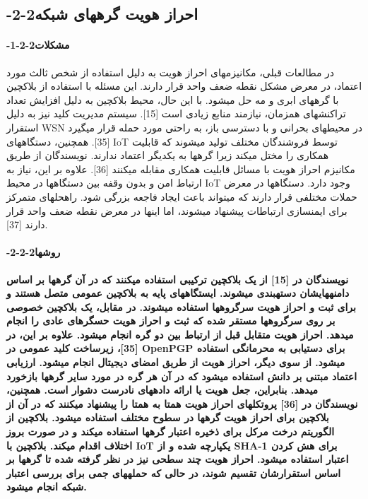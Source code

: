 \documentclass{article} %
\begin{document}
\noindent 
\subsection{ -2-2احراز هویت گرههای شبکه}

\noindent 
\paragraph{ -1-2-2مشکلات}

\noindent در مطالعات قبلی، مکانیزمهای احراز هویت به دلیل استفاده از شخص ثالث مورد اعتماد، در معرض مشکل نقطه ضعف واحد قرار دارند. این مسئله با استفاده از بلاکچین با گرههای ابری و مه حل میشود. با این حال، محیط بلاکچین به دلیل افزایش تعداد تراکنشهای همزمان، نیازمند منابع زیادی است [15]. سیستم مدیریت کلید نیز به دلیل استقرار WSN در محیطهای بحرانی و با دسترسی باز، به راحتی مورد حمله قرار میگیرد [35]. همچنین، دستگاههای IoT توسط فروشندگان مختلف تولید میشوند که قابلیت همکاری را مختل میکند زیرا گرهها به یکدیگر اعتماد ندارند. نویسندگان از طریق مکانیزم احراز هویت با مسائل قابلیت همکاری مقابله میکنند [36]. علاوه بر این، نیاز به ارتباط امن و بدون وقفه بین دستگاهها در محیط IoT وجود دارد. دستگاهها در معرض حملات مختلفی قرار دارند که میتواند باعث ایجاد فاجعه بزرگی شود. راهحلهای متمرکز برای ایمنسازی ارتباطات پیشنهاد میشوند، اما اینها در معرض نقطه ضعف واحد قرار دارند [37].

\noindent 
\paragraph{ -2-2-2روشها}

\noindent 
{\bf نویسندگان در [15] از یک بلاکچین ترکیبی استفاده میکنند که در آن گرهها بر اساس دامنههایشان دستهبندی میشوند. ایستگاههای پایه به بلاکچین عمومی متصل هستند و برای ثبت و احراز هویت سرگروهها استفاده میشوند. در مقابل، یک بلاکچین خصوصی بر روی سرگروهها مستقر شده که ثبت و احراز هویت حسگرهای عادی را انجام میدهد. احراز هویت متقابل قبل از ارتباط بین دو گره انجام میشود. علاوه بر این، در [35]، زیرساخت کلید عمومی در OpenPGP برای دستیابی به محرمانگی استفاده میشود. از سوی دیگر، احراز هویت از طریق امضای دیجیتال انجام میشود. ارزیابی اعتماد مبتنی بر دانش استفاده میشود که در آن هر گره در مورد سایر گرهها بازخورد میدهد. بنابراین، جعل هویت یا ارائه دادههای نادرست دشوار است. همچنین، نویسندگان در [36] پروتکلهای احراز هویت همتا به همتا را پیشنهاد میکنند که در آن از بلاکچین برای احراز هویت گرهها در سطوح مختلف استفاده میشود. بلاکچین از الگوریتم درخت مرکل برای ذخیره اعتبار گرهها استفاده میکند و در صورت بروز اختلاف اقدام میکند. بلاکچین با IoT یکپارچه شده و از SHA-1 برای هش کردن اعتبار استفاده میشود. احراز هویت چند سطحی نیز در نظر گرفته شده تا گرهها بر اساس استقرارشان تقسیم شوند، در حالی که حملههای جمی برای بررسی اعتبار شبکه انجام میشود.}
\end{document}
